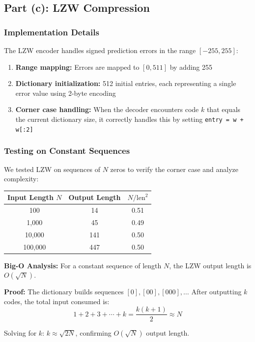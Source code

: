 \documentclass[11pt,a4paper]{article}
\begin{document}
\subsection{Part (c): LZW Compression}

\subsubsection{Implementation Details}
The LZW encoder handles signed prediction errors in the range $[-255, 255]$:
\begin{enumerate}
    \item \textbf{Range mapping:} Errors are mapped to $[0, 511]$ by adding 255
    \item \textbf{Dictionary initialization:} 512 initial entries, each representing a single error value using 2-byte encoding
    \item \textbf{Corner case handling:} When the decoder encounters code $k$ that equals the current dictionary size, it correctly handles this by setting \texttt{entry = w + w[:2]}
\end{enumerate}

\subsubsection{Testing on Constant Sequences}
We tested LZW on sequences of $N$ zeros to verify the corner case and analyze complexity:

\begin{center}
\begin{tabular}{|c|c|c|}
\hline
\textbf{Input Length $N$} & \textbf{Output Length} & \textbf{$N/\text{len}^2$} \\
\hline
100 & 14 & 0.51 \\
1,000 & 45 & 0.49 \\
10,000 & 141 & 0.50 \\
100,000 & 447 & 0.50 \\
\hline
\end{tabular}
\end{center}

\textbf{Big-O Analysis:} For a constant sequence of length $N$, the LZW output length is $O(\sqrt{N})$.

\textbf{Proof:} The dictionary builds sequences $[0], [00], [000], \ldots$ After outputting $k$ codes, the total input consumed is:
$$1 + 2 + 3 + \cdots + k = \frac{k(k+1)}{2} \approx N$$

Solving for $k$: $k \approx \sqrt{2N}$, confirming $O(\sqrt{N})$ output length.
\end{document}

